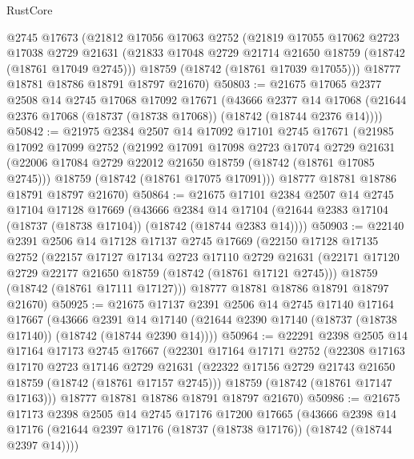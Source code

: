 \begin{lexlean}{RustCore}
\begin{coremodule}
    @2745
    @17673
    (@21812
      @17056
      @17063
      @2752
      (@21819
        @17055
        @17062
        @2723
        @17038
        @2729
        @21631
        (@21833 @17048 @2729 @21714 @21650 @18759 (@18742 (@18761 @17049 @2745)))
        @18759
        (@18742 (@18761 @17039 @17055)))
      @18777
      @18781
      @18786
      @18791
      @18797
      @21670)
@50803 := @21675
    @17065
    @2377
    @2508
    @14
    @2745
    @17068
    @17092
    @17671
    (@43666
      @2377
      @14
      @17068
      (@21644 @2376 @17068 (@18737 (@18738 @17068)) (@18742 (@18744 @2376 @14))))
@50842 := @21975
    @2384
    @2507
    @14
    @17092
    @17101
    @2745
    @17671
    (@21985
      @17092
      @17099
      @2752
      (@21992
        @17091
        @17098
        @2723
        @17074
        @2729
        @21631
        (@22006 @17084 @2729 @22012 @21650 @18759 (@18742 (@18761 @17085 @2745)))
        @18759
        (@18742 (@18761 @17075 @17091)))
      @18777
      @18781
      @18786
      @18791
      @18797
      @21670)
@50864 := @21675
    @17101
    @2384
    @2507
    @14
    @2745
    @17104
    @17128
    @17669
    (@43666
      @2384
      @14
      @17104
      (@21644 @2383 @17104 (@18737 (@18738 @17104)) (@18742 (@18744 @2383 @14))))
@50903 := @22140
    @2391
    @2506
    @14
    @17128
    @17137
    @2745
    @17669
    (@22150
      @17128
      @17135
      @2752
      (@22157
        @17127
        @17134
        @2723
        @17110
        @2729
        @21631
        (@22171 @17120 @2729 @22177 @21650 @18759 (@18742 (@18761 @17121 @2745)))
        @18759
        (@18742 (@18761 @17111 @17127)))
      @18777
      @18781
      @18786
      @18791
      @18797
      @21670)
@50925 := @21675
    @17137
    @2391
    @2506
    @14
    @2745
    @17140
    @17164
    @17667
    (@43666
      @2391
      @14
      @17140
      (@21644 @2390 @17140 (@18737 (@18738 @17140)) (@18742 (@18744 @2390 @14))))
@50964 := @22291
    @2398
    @2505
    @14
    @17164
    @17173
    @2745
    @17667
    (@22301
      @17164
      @17171
      @2752
      (@22308
        @17163
        @17170
        @2723
        @17146
        @2729
        @21631
        (@22322 @17156 @2729 @21743 @21650 @18759 (@18742 (@18761 @17157 @2745)))
        @18759
        (@18742 (@18761 @17147 @17163)))
      @18777
      @18781
      @18786
      @18791
      @18797
      @21670)
@50986 := @21675
    @17173
    @2398
    @2505
    @14
    @2745
    @17176
    @17200
    @17665
    (@43666
      @2398
      @14
      @17176
      (@21644 @2397 @17176 (@18737 (@18738 @17176)) (@18742 (@18744 @2397 @14))))

\end{coremodule}
\end{lexlean}

